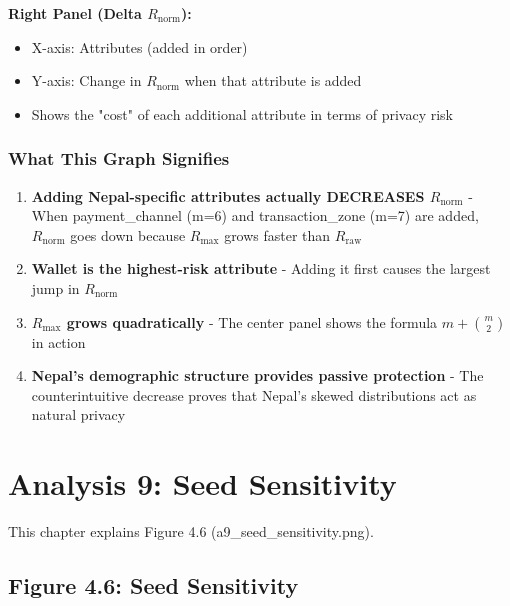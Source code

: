 \documentclass[12pt,a4paper,oneside,openany]{report}
\begin{document}
\textbf{Right Panel (Delta $R_{\mathrm{norm}}$):}
\begin{itemize}
    \item X-axis: Attributes (added in order)
    \item Y-axis: Change in $R_{\mathrm{norm}}$ when that attribute is added
    \item Shows the "cost" of each additional attribute in terms of privacy risk
\end{itemize}

\subsection{What This Graph Signifies}
\begin{enumerate}
    \item \textbf{Adding Nepal-specific attributes actually DECREASES $R_{\mathrm{norm}}$} - When payment\_channel (m=6) and transaction\_zone (m=7) are added, $R_{\mathrm{norm}}$ goes down because $R_{\mathrm{max}}$ grows faster than $R_{\mathrm{raw}}$
    \item \textbf{Wallet is the highest-risk attribute} - Adding it first causes the largest jump in $R_{\mathrm{norm}}$
    \item \textbf{$R_{\mathrm{max}}$ grows quadratically} - The center panel shows the formula $m + \binom{m}{2}$ in action
    \item \textbf{Nepal's demographic structure provides passive protection} - The counterintuitive decrease proves that Nepal's skewed distributions act as natural privacy
\end{enumerate}

\chapter{Analysis 9: Seed Sensitivity}
\label{chap:a9}

This chapter explains Figure 4.6 (a9\_seed\_sensitivity.png).

\section{Figure 4.6: Seed Sensitivity}
\label{sec:f4.6}
\end{document}
